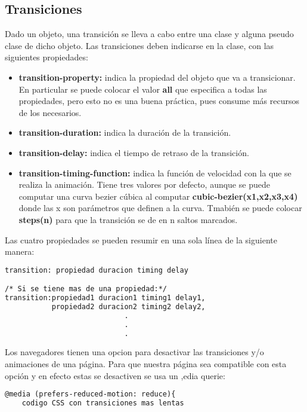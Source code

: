 \documentclass[10pt,oneside]{article}
\begin{document}
\begin{multicols}{2}
\subsection{Transiciones}

    Dado un objeto, una transición se lleva a cabo entre una clase y alguna pseudo clase de dicho objeto. Las transiciones deben indicarse en la clase, con las siguientes propiedades:
    \begin{itemize}
        \item \textbf{transition-property:} indica la propiedad del objeto que va a transicionar. En particular se puede colocar el valor \textbf{all} que especifica a todas las propiedades, pero esto no es una buena práctica, pues consume más recursos de los necesarios.
        \item \textbf{transition-duration:} indica la duración de la transición.
        \item \textbf{transition-delay:} indica el tiempo de retraso de la transición. 
        \item \textbf{transition-timing-function:} indica la función de velocidad con la  que se realiza la animación. Tiene tres valores por defecto, aunque se puede computar una curva bezier cúbica al computar \textbf{cubic-bezier(x1,x2,x3,x4)} donde las x son parámetros que definen a la curva. Tmabién se puede colocar \textbf{steps(n)} para que la transición se de en n saltos marcados.
        \end{itemize}
    Las cuatro propiedades se pueden resumir en una sola línea de la siguiente manera:

    \begin{lstlisting}[language=HTML]
transition: propiedad duracion timing delay 

/* Si se tiene mas de una propiedad:*/
transition:propiedad1 duracion1 timing1 delay1,
           propiedad2 duracion2 timing2 delay2,
                            .
                            .
                            .
    \end{lstlisting}

    Los navegadores tienen una opcion para desactivar las transiciones y/o animaciones de una página. Para que nuestra página sea compatible con esta opción y en efecto estas se desactiven se usa un ,edia querie: 

    \begin{lstlisting}[language=HTML]
@media (prefers-reduced-motion: reduce){
    codigo CSS con transiciones mas lentas


\end{lstlisting}
\end{multicols}
\end{document}
